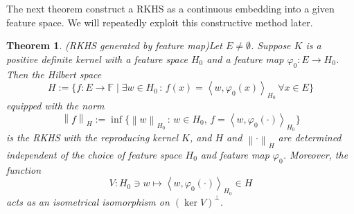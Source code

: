 \documentclass[a4paper,12pt]{article}
\newtheorem{thm}{Theorem}[section]
\theoremstyle{remark}
\theoremstyle{definition}
\theoremstyle{definition}
\theoremstyle{definition}
\newcommand{\ip}[2]{\left<#1, #2 \right>}
\newcommand{\norm}[1]{\left\| #1 \right\|}
\begin{document}
The next theorem construct a RKHS as a continuous embedding into a given feature space. We will repeatedly exploit this constructive method later.
\begin{thm} (RKHS generated by feature map)\label{rkhs generated by feature map}
	Let \( E \neq \emptyset \). Suppose \( K \) is a positive definite kernel with a feature space \( H_0 \) and a feature map \( \varphi_0 :E \to H_0 \). Then the Hilbert space
	\begin{equation*}
		H:= \{f:E \to \mathbb{F} \mid \exists w \in H_0 \,:\, f(x)=\ip{w}{\varphi_0(x)}_{H_0}\, \forall x \in E \}
	\end{equation*}
	equipped with the norm
	\begin{equation}\label{norm defined by feature map}
		\norm{f}_H := \inf \{\norm{w}_{H_0} \,:\, w \in H_0,\, f = \ip{w}{\varphi_0(\cdot )}_{H_0}\}
	\end{equation}
	is the RKHS with the reproducing kernel \( K \), and \( H \) and \( \norm{\cdot }_H \) are determined independent of the choice of feature space \( H_0 \) and feature map \( \varphi_0 \). Moreover, the function
	\begin{equation*}
		V : H_0 \ni w \mapsto \ip{w}{\varphi_0(\cdot )}_{H_0} \in H
	\end{equation*}
	acts as an isometrical isomorphism on \( (\ker V)^{\perp} \).
\end{thm}
\end{document}
